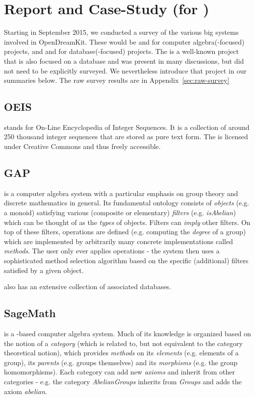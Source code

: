 \section{Report and Case-Study  (for )}\label{sec:survey}

Starting in September 2015, we conducted a survey of the various big systems involved in OpenDreamKit. These would be \SageMath and \GAP for computer algebra(-focused) projects, and \FindStat and \LMFDB for database(-focused) projects. The \OEIS is a well-known project that is also focused on a database and was present in many discussions, but did not need to be explicitly surveyed. We nevertheless introduce that project in our summaries below. The raw survey results are in Appendix~\ref{sec:raw-survey}


\subsection{OEIS}
\OEIS \cite{oeis} stands for On-Line Encyclopedia of Integer Sequences. It is a collection
of around 250 thousand integer sequences that are stored as pure text form. The \OEIS is
licensed under Creative Commons and thus freely accessible.

\subsection{GAP} 
\GAP \cite{gap} is a computer algebra system with a particular emphasis on group theory and discrete mathematics in general. Its fundamental
ontology consists of \emph{objects} (e.g. a monoid) satisfying various (composite or elementary) \emph{filters} (e.g. \emph{isAbelian}) which
can be thought of as the \emph{types} of objects. Filters can \emph{imply} other filters.
On top of these filters, operations are defined (e.g. computing the \emph{degree} of a group) which are implemented by arbitrarily many concrete implementations
called \emph{methods}. The user only ever applies operations - the \GAP system then uses a sophisticated method selection algorithm based on
the specific (additional) filters satisfied by a given object.

\GAP also has an extensive collection of associated databases. 

\subsection{SageMath}
\SageMath \cite{sagemath} is a \python-based computer algebra system. Much of its knowledge is organized based on the notion of a \emph{category} (which is related to, but not equivalent to the category theoretical notion),
which provides \emph{methods} on its \emph{elements} (e.g. elements of a group), its \emph{parents} (e.g. groups themselves) and its \emph{morphisms}
(e.g. the group homomorphisms). Each category can add new \emph{axioms} and inherit from other categories - e.g. the category \emph{AbelianGroups} inherits from \emph{Groups} and adds the axiom \emph{abelian}.

